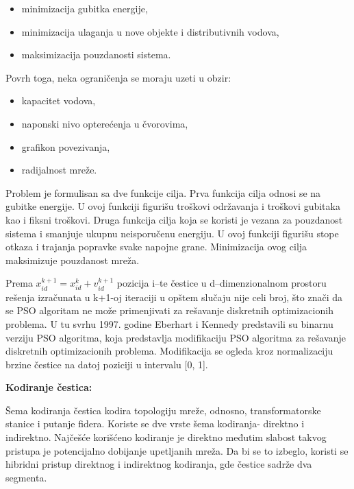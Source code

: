 \documentclass[a4paper]{article}
\begin{document}
\begin{itemize}
    \item minimizacija gubitka energije,
    \item minimizacija ulaganja u nove objekte i distributivnih vodova,
    \item maksimizacija pouzdanosti sistema.
\end{itemize}


Povrh toga, neka ograničenja se moraju uzeti u obzir:

\begin{itemize}
    \item kapacitet vodova,
    \item naponski nivo opterećenja u čvorovima,
    \item grafikon povezivanja,
    \item radijalnost mreže.
\end{itemize}

\vspace{5mm} 

Problem je formulisan sa dve funkcije cilja. Prva funkcija cilja odnosi se na gubitke energije. U ovoj funkciji figurišu troškovi održavanja i troškovi gubitaka kao i fiksni troškovi. Druga funkcija cilja koja se koristi je vezana za pouzdanost sistema i smanjuje ukupnu neisporučenu energiju. U ovoj funkciji figurišu stope otkaza i trajanja popravke svake napojne grane. Minimizacija ovog cilja maksimizuje pouzdanost mreža.

\vspace{5mm} 

Prema \(x_{i d}^{k+1} = x_{i d}^{k} + v_{i d}^{k+1}  \) pozicija i–te čestice u d–dimenzionalnom prostoru rešenja izračunata u k+1-oj iteraciji u opštem slučaju nije celi broj, što znači da se PSO algoritam ne može primenjivati za rešavanje diskretnih optimizacionih problema. U tu svrhu 1997. godine Eberhart i Kennedy predstavili su binarnu verziju PSO algoritma, koja predstavlja modifikaciju PSO algoritma za rešavanje diskretnih optimizacionih problema. Modifikacija se ogleda kroz normalizaciju brzine čestice na datoj poziciji u intervalu [0, 1].

\vspace{10mm} 

\textbf{Kodiranje čestica:} 

\vspace{5mm} 

Šema kodiranja čestica kodira topologiju mreže, odnosno, transformatorske stanice i putanje fidera. Koriste se dve vrste šema kodiranja- direktno i indirektno. Najčešće korišćeno kodiranje je direktno međutim slabost takvog pristupa je potencijalno dobijanje upetljanih mreža. Da bi se to izbeglo, koristi se hibridni pristup direktnog i indirektnog kodiranja, gde čestice sadrže dva segmenta.
\end{document}
